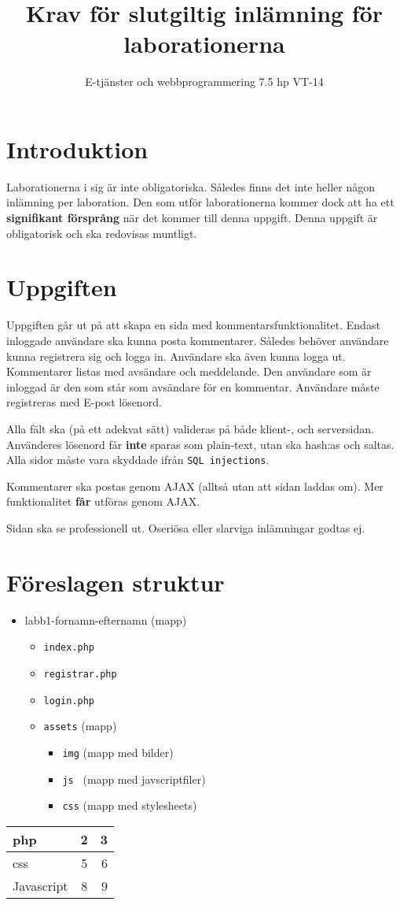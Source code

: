 \documentclass[12pt]{article}
\date{}
\title{ Krav för slutgiltig inlämning för laborationerna }
\author{ E-tjänster och webbprogrammering 7.5 hp VT-14 }
\begin{document}
\maketitle
\vspace{-2em}



\section{Introduktion}
Laborationerna i sig är inte obligatoriska. Således finns det inte heller någon inlämning per laboration. Den som utför laborationerna kommer dock att ha ett \textbf{signifikant försprång} när det kommer till denna uppgift. Denna uppgift är obligatorisk och ska redovisas muntligt.

\section{Uppgiften}
Uppgiften går ut på att skapa en sida med kommentarsfunktionalitet. Endast inloggade användare ska kunna posta kommentarer. Således behöver användare kunna registrera sig och logga in. Användare ska även kunna logga ut. Kommentarer listas med avsändare och meddelande. Den användare som är inloggad är den som står som avsändare för en kommentar. Användare måste registreras med E-post lösenord.

Alla fält ska (på ett adekvat sätt) valideras på både klient-, och serversidan. Använderes lösenord får \textbf{inte} sparas som plain-text, utan ska hash:as och saltas. Alla sidor måste vara skyddade ifrån \texttt{SQL injections}.

Kommentarer ska postas genom AJAX (alltså utan att sidan laddas om). Mer funktionalitet \textbf{får} utföras genom AJAX.

Sidan ska se professionell ut. Oseriösa eller slarviga inlämningar godtas ej.






\pagebreak
\section{Föreslagen struktur}
  \begin{itemize}
    \item labb1-fornamn-efternamn (mapp)
    \begin{itemize}
      \item \texttt{index.php}
      \item \texttt{registrar.php} 
      \item \texttt{login.php}  
      \item \texttt{assets} (mapp)
      \begin{itemize}
        \item \texttt{img} (mapp med bilder)
        \item \texttt{js  } (mapp med javscriptfiler)
        \item \texttt{css} (mapp med stylesheets)
      \end{itemize}
    \end{itemize}
  \end{itemize}




\begin{tabular}{ l | c | r }
  php & 2 & 3 \\ \hline
  css & 5 & 6 \\ \hline
  Javascript & 8 & 9 \\
\end{tabular}
\end{document}
